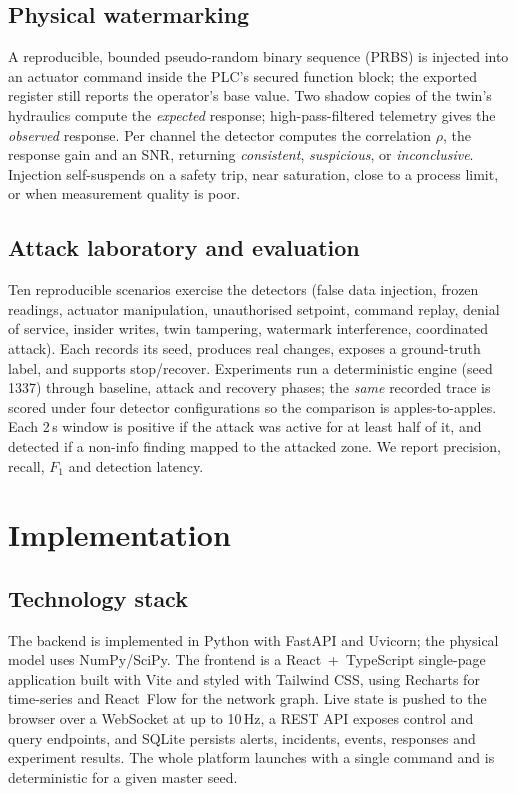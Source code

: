 \documentclass[11pt,a4paper]{article}
\begin{document}
\subsection{Physical watermarking}
A reproducible, bounded pseudo-random binary sequence (PRBS) is injected into an actuator command inside the PLC's secured function block; the exported register still reports the operator's base value. Two shadow copies of the twin's hydraulics compute the \emph{expected} response; high-pass-filtered telemetry gives the \emph{observed} response. Per channel the detector computes the correlation $\rho$, the response gain and an SNR, returning \textit{consistent}, \textit{suspicious}, or \textit{inconclusive}. Injection self-suspends on a safety trip, near saturation, close to a process limit, or when measurement quality is poor.

\subsection{Attack laboratory and evaluation}
Ten reproducible scenarios exercise the detectors (false data injection, frozen readings, actuator manipulation, unauthorised setpoint, command replay, denial of service, insider writes, twin tampering, watermark interference, coordinated attack). Each records its seed, produces real changes, exposes a ground-truth label, and supports stop/recover. Experiments run a deterministic engine (seed 1337) through baseline, attack and recovery phases; the \emph{same} recorded trace is scored under four detector configurations so the comparison is apples-to-apples. Each 2\,s window is positive if the attack was active for at least half of it, and detected if a non-info finding mapped to the attacked zone. We report precision, recall, $F_1$ and detection latency.

\section{Implementation}
\subsection{Technology stack}
The backend is implemented in Python with FastAPI and Uvicorn; the physical model uses NumPy/SciPy. The frontend is a React~+~TypeScript single-page application built with Vite and styled with Tailwind CSS, using Recharts for time-series and React~Flow for the network graph. Live state is pushed to the browser over a WebSocket at up to 10\,Hz, a REST API exposes control and query endpoints, and SQLite persists alerts, incidents, events, responses and experiment results. The whole platform launches with a single command and is deterministic for a given master seed.
\end{document}
